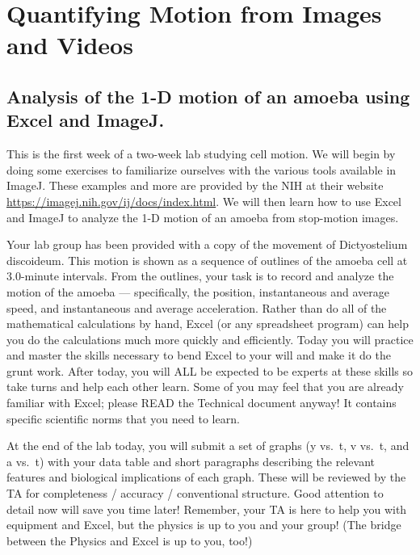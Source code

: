 \chapter{Quantifying Motion from Images and Videos}
\thispagestyle{fancy}
\section{Analysis of the 1-D motion of an amoeba using Excel and ImageJ.}
This is the first week of a two-week lab studying cell motion.
We will begin by doing some exercises to familiarize ourselves with the various tools available in ImageJ.
These examples and more are provided by the NIH at their website \url{https://imagej.nih.gov/ij/docs/index.html}.
We will then learn how to use Excel and ImageJ to analyze the 1-D motion of an amoeba from stop-motion images.
\par
Your lab group has been provided with a copy of the movement of Dictyostelium discoideum.
This motion is shown as a sequence of outlines of the amoeba cell at 3.0-minute intervals.
From the outlines, your task is to record and analyze the motion of the amoeba — specifically, the position, instantaneous and average speed, and instantaneous and average acceleration.
Rather than do all of the mathematical calculations by hand, Excel (or any spreadsheet program) can help you do the calculations much more quickly and efficiently.
Today you will practice and master the skills necessary to bend Excel to your will and make it do the grunt work.
After today, you will ALL be expected to be experts at these skills so take turns and help each other learn.
Some of you may feel that you are already familiar with Excel; please READ the Technical document anyway!
It contains specific scientific norms that you need to learn.
\par
At the end of the lab today, you will submit a set of graphs (y vs.\ t, v vs.\ t, and a vs.\ t) with your data table and short paragraphs describing the relevant features and biological implications of each graph.
These will be reviewed by the TA for completeness / accuracy / conventional structure.
Good attention to detail now will save you time later!
Remember, your TA is here to help you with equipment and Excel, but the physics is up to you and your group!
(The bridge between the Physics and Excel is up to you, too!)
